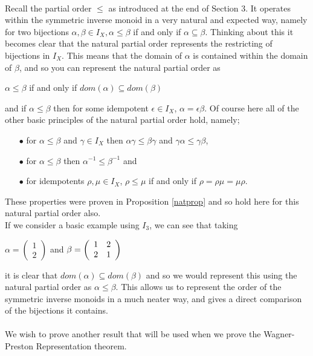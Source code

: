 \documentclass[12pt]{article}
\begin{document}
\\Recall the partial order $\leq$ as introduced at the end of Section 3. It operates within the symmetric inverse monoid in a very natural and expected way, namely for two bijections $\alpha, \beta \in I_X, \alpha \leq \beta$ if and only if $\alpha \subseteq \beta$\cite{3}. Thinking about this it becomes clear that the natural partial order represents the restricting of bijections in $I_X$. This means that the domain of $\alpha$ is contained within the domain of $\beta$, and so you can represent the natural partial order as
	\begin{center}
		$\alpha \leq \beta$ if and only if $dom(\alpha) \subseteq dom(\beta)$
	\end{center}
and if $\alpha \leq \beta$ then for some idempotent $\epsilon \in I_X$, $\alpha = \epsilon \beta$.
Of course here all of the other basic principles of the natural partial order hold, namely;
	\begin{itemize}
		\item[$\bullet$] for $\alpha \leq \beta$ and $\gamma \in I_X$ then $\alpha \gamma \leq \beta \gamma$ and $\gamma \alpha \leq \gamma \beta$,
		\item[$\bullet$] for $\alpha \leq \beta$ then $\alpha^{-1} \leq \beta^{-1}$ and
		\item[$\bullet$] for idempotents $\rho, \mu \in I_X$, $\rho \leq \mu$ if and only if $\rho = \rho \mu = \mu \rho$.
	\end{itemize}
These properties were proven in Proposition \ref{natprop} and so hold here for this natural partial order also.\\
If we consider a basic example using $I_3$, we can see that taking 
\begin{center}
	$\alpha =\left(
		\begin{array}{c}
		1  \\
		2 
		\end{array}
		\right)$
and
	$\beta = \left(
		\begin{array}{c c}
		1  & 2\\
		2  & 1
		\end{array}
		\right)$
\end{center}
it is clear that $dom(\alpha) \subseteq dom(\beta)$ and so we would represent this using the natural partial order as $\alpha \leq \beta$. This allows us to represent the order of the symmetric inverse monoids in a much neater way, and gives a direct comparison of the bijections it contains.\\
\\We wish to prove another result that will be used when we prove the Wagner-Preston Representation theorem.
\end{document}
